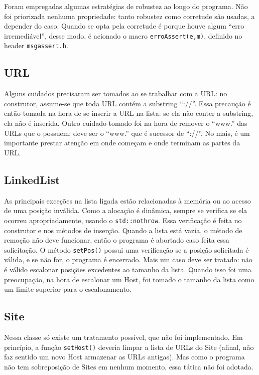 \documentclass{article}
\def\code#1{\texttt{#1}}
\begin{document}
Foram empregadas algumas estratégias de robustez ao longo do programa. Não foi priorizada nenhuma propriedade: tanto robustez como corretude são usadas, a depender do caso. Quando se opta pela corretude é porque houve algum ``erro irremediável'', desse modo, é acionado o macro \code{erroAssert(e,m)}, definido no header \code{msgassert.h}.

\subsection{URL}

Alguns cuidados precisaram ser tomados ao se trabalhar com a URL: no construtor, assume-se que toda URL contém a substring ``://''. Essa precaução é então tomada na hora de se inserir a URL na lista: se ela não conter a substring, ela não é inserida. Outro cuidado tomado foi na hora de remover o ``www.'' das URLs que o possuem: deve ser o ``www.'' que é sucessor de ``://''. No mais, é um importante prestar atenção em onde começam e onde terminam as partes da URL.

\subsection{LinkedList}

As principais exceções na lista ligada estão relacionadas à memória ou ao acesso de uma posição inválida. Como a alocação é dinâmica, sempre se verifica se ela ocorreu apropriadamente, usando o \code{std::nothrow}. Essa verificação é feita no construtor e nos métodos de inserção. Quando a lista está vazia, o método de remoção não deve funcionar, então o programa é abortado caso feita essa solicitação. O método \code{setPos()} possui uma verificação se a posição solicitada é válida, e se não for, o programa é encerrado. Mais um caso deve ser tratado: não é válido escalonar posições excedentes ao tamanho da lista. Quando isso foi uma preocupação, na hora de escalonar um Host, foi tomado o tamanho da lista como um limite superior para o escalonamento.

\subsection{Site}

Nessa classe só existe um tratamento possível, que não foi implementado. Em princípio, a função \code{setHost()} deveria limpar a lista de URLs do Site (afinal, não faz sentido um novo Host armazenar as URLs antigas). Mas como o programa não tem sobreposição de Sites em nenhum momento, essa tática não foi adotada.
\end{document}
